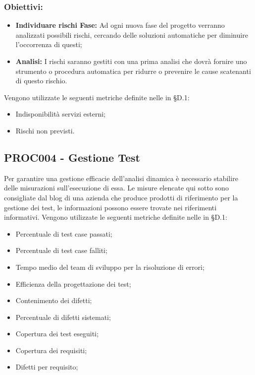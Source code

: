 \documentclass[PianoDiQualifica.tex]{subfiles}
\begin{document}
\subsubsection{Obiettivi:}
\begin{itemize}
	\item \textbf{Individuare rischi Fase:} Ad ogni nuova fase del progetto verranno analizzati possibili rischi, cercando delle soluzioni automatiche per diminuire l'occorrenza di questi;
	\item \textbf{Analisi:} I rischi saranno gestiti con una prima analisi che dovrà fornire uno strumento o procedura automatica per ridurre o prevenire le cause scatenanti di questo rischio.
\end{itemize}
Vengono utilizzate le seguenti metriche definite nelle \ndp in \S{D.1}:
\begin{itemize}
	\item {} Indisponibilità servizi esterni;
	\item {} Rischi non previsti.
\end{itemize}

\subsection{PROC004 - Gestione Test}	
Per garantire una gestione efficacie dell'analisi dinamica è necessario stabilire delle misurazioni sull'esecuzione di essa.
Le misure elencate qui sotto sono consigliate dal blog di una azienda che produce prodotti di riferimento per la gestione dei test, le informazioni possono essere trovate nei riferimenti informativi.
Vengono utilizzate le seguenti metriche definite nelle \ndp in \S{D.1}:
\begin{itemize}
	\item {} Percentuale di test case passati;
	\item {} Percentuale di test case falliti;
	\item {} Tempo medio del team di sviluppo per la risoluzione di errori;
	\item {} Efficienza della progettazione dei test;
	\item {} Contenimento dei difetti;
	\item {} Percentuale di difetti sistemati;
	\item {} Copertura dei test eseguiti;
	\item {} Copertura dei requisiti;
	\item {} Difetti per requisito;	
\end{itemize}
\end{document}
